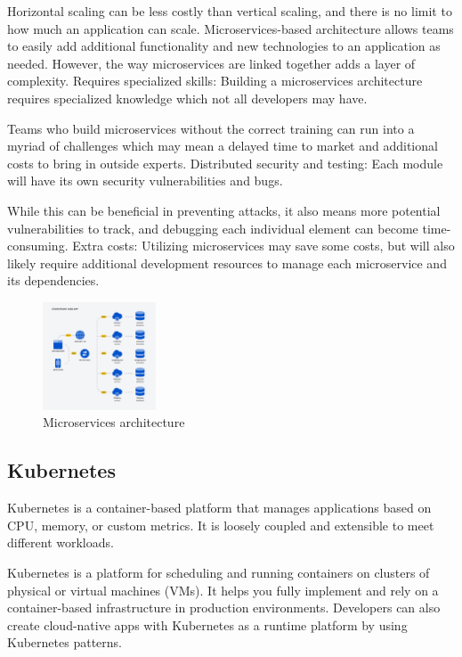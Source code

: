 \documentclass[conference]{IEEEtran}
\begin{document}
Horizontal scaling can be less costly than vertical scaling, and there is no limit to how much an application can scale.
Microservices-based architecture allows teams to easily add additional functionality and new technologies to an application as needed. However, the way microservices are linked together adds a layer of complexity.
Requires specialized skills: Building a microservices architecture requires specialized knowledge which not all developers may have.

Teams who build microservices without the correct training can run into a myriad of challenges which may mean a delayed time to market and additional costs to bring in outside experts.
Distributed security and testing: Each module will have its own security vulnerabilities and bugs.

While this can be beneficial in preventing attacks, it also means more potential vulnerabilities to track, and debugging each individual element can become time-consuming.
Extra costs: Utilizing microservices may save some costs, but will also likely require additional development resources to manage each microservice and its dependencies.

\begin{figure}[!h]
    \begin{center}
        \includegraphics[width=0.3\textwidth]{figures/microservice.png}
    \end{center}
    \caption{Microservices architecture}
    \label{fig:2}
\end{figure}


\subsection{Kubernetes}

Kubernetes is a container-based platform that manages applications based on CPU, memory, or custom metrics. It is loosely coupled and extensible to meet different workloads.

Kubernetes is a platform for scheduling and running containers on clusters of physical or virtual machines (VMs). It helps you fully implement and rely on a container-based infrastructure in production environments. Developers can also create cloud-native apps with Kubernetes as a runtime platform by using Kubernetes patterns.
\end{document}

